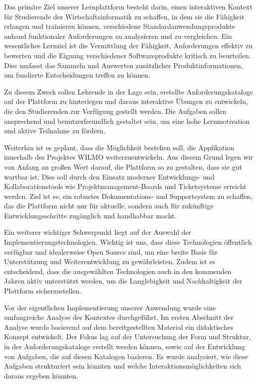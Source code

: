 
Das primäre Ziel unserer Lernplattform besteht darin, einen interaktiven Kontext für Studierende der Wirtschaftsinformatik zu schaffen, in dem sie die Fähigkeit erlangen und trainieren können, verschiedene Standardanwendungsprodukte anhand funktionaler Anforderungen zu analysieren und zu vergleichen. Ein wesentliches Lernziel ist die Vermittlung der Fähigkeit, Anforderungen effektiv zu bewerten und die Eignung verschiedener Softwareprodukte kritisch zu beurteilen. Dies umfasst das Sammeln und Auswerten zusätzlicher Produktinformationen, um fundierte Entscheidungen treffen zu können.

Zu diesem Zweck sollen Lehrende in der Lage sein, erstellte Anforderungskataloge auf der Plattform zu hinterlegen und daraus interaktive Übungen zu entwickeln, die den Studierenden zur Verfügung gestellt werden. Die Aufgaben sollen ansprechend und benutzerfreundlich gestaltet sein, um eine hohe Lernmotivation und aktive Teilnahme zu fördern.

Weiterhin ist es geplant, dass die Möglichkeit bestehen soll, die Applikation innerhalb des Projektes WILMO weiterzuentwickeln. Aus diesem Grund legen wir von Anfang an großen Wert darauf, die Plattform so zu gestalten, dass sie gut wartbar ist. Dies soll durch den Einsatz moderner Entwicklungs- und Kollaborationstools wie Projektmanagement-Boards und Ticketsysteme erreicht werden. Ziel ist es, ein robustes Dokumentations- und Supportsystem zu schaffen, das die Plattform nicht nur für aktuelle, sondern auch für zukünftige Entwicklungsschritte zugänglich und handhabbar macht.

Ein weiterer wichtiger Schwerpunkt liegt auf der Auswahl der Implementierungstechnologien. Wichtig ist uns, dass diese Technologien öffentlich verfügbar und idealerweise Open Source sind, um eine breite Basis für Unterstützung und Weiterentwicklung zu gewährleisten. Zudem ist es entscheidend, dass die ausgewählten Technologien auch in den kommenden Jahren aktiv unterstützt werden, um die Langlebigkeit und Nachhaltigkeit der Plattform sicherzustellen.


Vor der eigentlichen Implementierung unserer Anwendung wurde eine umfangreiche Analyse des Kontextes durchgeführt. Im ersten Abschnitt der Analyse wurde basierend auf dem bereitgestellten Material ein didaktisches Konzept entwickelt. Der Fokus lag auf der Untersuchung der Form und Struktur, in der Anforderungskataloge erstellt werden können, sowie auf der Entwicklung von Aufgaben, die auf diesen Katalogen basieren. Es wurde analysiert, wie diese Aufgaben strukturiert sein könnten und welche Interaktionsmöglichkeiten sich daraus ergeben könnten.

